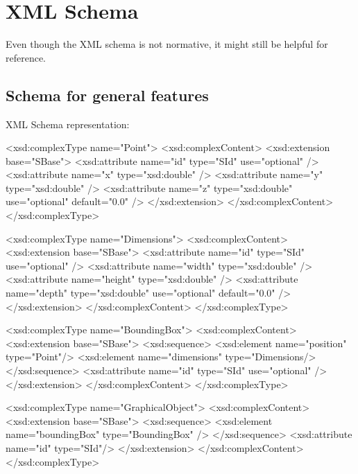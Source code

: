 \section{XML Schema}
\label{xml:schema}
Even though the XML schema is not normative, it might still be helpful for reference.

\subsection{Schema for general features}

XML Schema representation:

\begin{example}
<xsd:complexType name="Point">
 <xsd:complexContent>
  <xsd:extension base="SBase">
   <xsd:attribute name="id" type="SId" use="optional" />
   <xsd:attribute name="x"  type="xsd:double" />
   <xsd:attribute name="y"  type="xsd:double" />
   <xsd:attribute name="z"  type="xsd:double" use="optional" default="0.0" />
  </xsd:extension>
 </xsd:complexContent>
</xsd:complexType>

<xsd:complexType name="Dimensions">
 <xsd:complexContent>
  <xsd:extension base="SBase">
   <xsd:attribute name="id" type="SId" use="optional" />
   <xsd:attribute name="width"  type="xsd:double" />
   <xsd:attribute name="height" type="xsd:double" />
   <xsd:attribute name="depth"  type="xsd:double" use="optional" default="0.0" />
  </xsd:extension>
 </xsd:complexContent>
</xsd:complexType>

<xsd:complexType name="BoundingBox">
 <xsd:complexContent>
  <xsd:extension base="SBase">
   <xsd:sequence>
     <xsd:element name="position" type="Point"/>
     <xsd:element name="dimensions" type="Dimensions/>
   </xsd:sequence>
   <xsd:attribute name="id" type="SId" use="optional" />
  </xsd:extension>
 </xsd:complexContent>
</xsd:complexType>

<xsd:complexType name="GraphicalObject">
 <xsd:complexContent>
  <xsd:extension base="SBase">
   <xsd:sequence>
     <xsd:element name="boundingBox" type="BoundingBox" />
   </xsd:sequence>
   <xsd:attribute name="id" type="SId"/>
  </xsd:extension>
 </xsd:complexContent>
</xsd:complexType>
\end{example}

